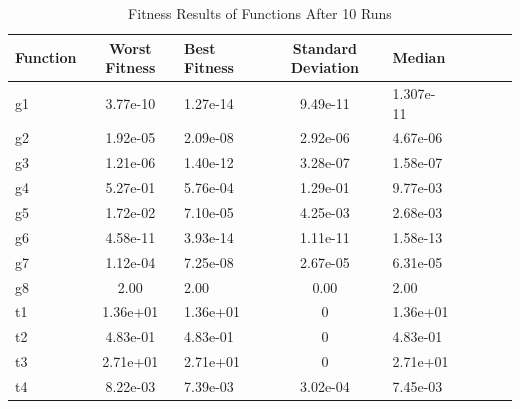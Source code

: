 \begin{table}[h!]
\centering
\begin{tabular}{l c l c l c l c l}
\hline
 Function & Worst Fitness       & Best Fitness        & Standard Deviation          & Median        \\
\hline
g1   & 3.77e-10& 1.27e-14& 9.49e-11& 1.307e-11\\
\hline
g2  &1.92e-05 & 2.09e-08& 2.92e-06& 4.67e-06 \\
\hline
g3  &1.21e-06& 1.40e-12& 3.28e-07& 1.58e-07 \\
\hline
g4  &5.27e-01& 5.76e-04& 1.29e-01& 9.77e-03 \\
\hline
g5  &1.72e-02& 7.10e-05& 4.25e-03& 2.68e-03 \\
\hline
g6  &4.58e-11& 3.93e-14& 1.11e-11& 1.58e-13 \\
\hline
g7  &1.12e-04& 7.25e-08& 2.67e-05& 6.31e-05 \\
\hline
g8  &2.00 & 2.00 & 0.00 & 2.00 \\
\hline
t1  &1.36e+01& 1.36e+01& 0& 1.36e+01 \\
\hline
t2  &4.83e-01& 4.83e-01& 0& 4.83e-01 \\
\hline
t3  &2.71e+01& 2.71e+01& 0& 2.71e+01 \\
\hline
t4  &8.22e-03& 7.39e-03& 3.02e-04& 7.45e-03 \\
\hline
\end{tabular}
\caption{Fitness Results of Functions After 10 Runs}
\end{table}

